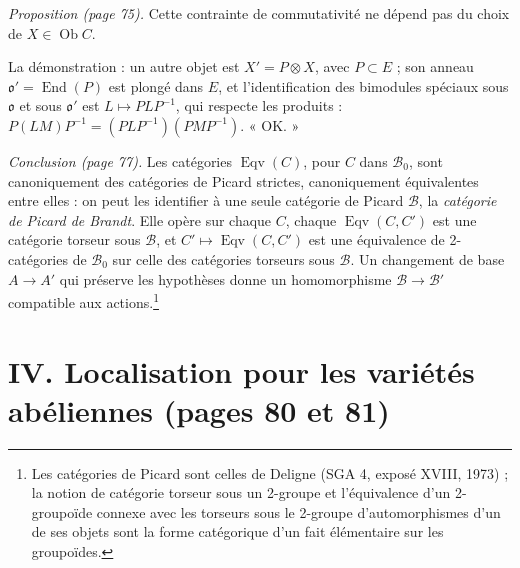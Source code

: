 \documentclass[11pt,a4paper]{article}
\begin{document}
\emph{Proposition (page 75).} Cette contrainte de commutativité ne dépend pas
du choix de $X \in \operatorname{Ob} C$.

La démonstration : un autre objet est $X' = P \otimes X$, avec $P \subset E$ ; son
anneau $\mathfrak{o}' = \operatorname{End}(P)$ est plongé dans $E$, et
l'identification des bimodules spéciaux sous $\mathfrak{o}$ et sous
$\mathfrak{o}'$ est $L \mapsto PLP^{-1}$, qui respecte les produits :
$P(LM)P^{-1} = (PLP^{-1})(PMP^{-1})$. « OK. »

\emph{Conclusion (page 77).} Les catégories $\operatorname{Eqv}(C)$, pour $C$
dans $\mathcal{B}_{0}$, sont canoniquement des catégories de Picard strictes,
canoniquement équivalentes entre elles : on peut les identifier à une seule
catégorie de Picard $\mathcal{B}$, la \emph{catégorie de Picard de Brandt}.
Elle opère sur chaque $C$, chaque $\operatorname{Eqv}(C, C')$ est une catégorie
torseur sous $\mathcal{B}$, et $C' \mapsto \operatorname{Eqv}(C, C')$ est une
équivalence de 2-catégories de $\mathcal{B}_{0}$ sur celle des catégories
torseurs sous $\mathcal{B}$. Un changement de base $A \to A'$ qui préserve les
hypothèses donne un homomorphisme $\mathcal{B} \to \mathcal{B}'$ compatible aux
actions.\footnote{Les catégories de Picard sont celles de Deligne (SGA 4,
exposé XVIII, 1973) ; la notion de catégorie torseur sous un 2-groupe et
l'équivalence d'un 2-groupoïde connexe avec les torseurs sous le 2-groupe
d'automorphismes d'un de ses objets sont la forme catégorique d'un fait
élémentaire sur les groupoïdes.}

\section*{IV. Localisation pour les variétés abéliennes (pages 80 et 81)}
\end{document}
